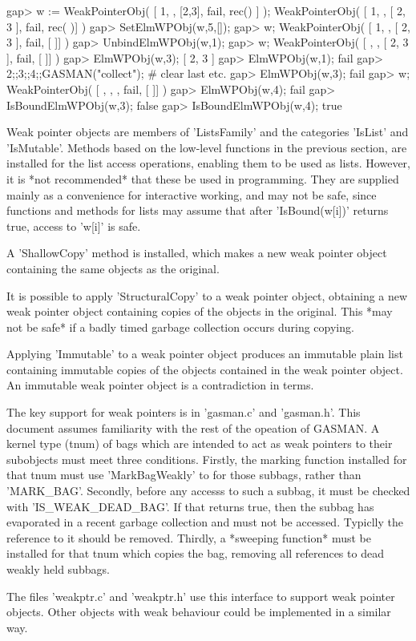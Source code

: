 \begintt
    gap>  w := WeakPointerObj( [ 1, , [2,3], fail, rec() ] );   
    WeakPointerObj( [ 1, , [ 2, 3 ], fail, rec(
       )] )
    gap> SetElmWPObj(w,5,[]);
    gap> w;
    WeakPointerObj( [ 1, , [ 2, 3 ], fail, [  ]] )
    gap> UnbindElmWPObj(w,1);
    gap> w;
    WeakPointerObj( [ , , [ 2, 3 ], fail, [  ]] )
    gap> ElmWPObj(w,3);      
    [ 2, 3 ]
    gap> ElmWPObj(w,1);
    fail
    gap> 2;;3;;4;;GASMAN("collect"); # clear last etc.
    gap> ElmWPObj(w,3);          
    fail
    gap> w;
    WeakPointerObj( [ , , , fail, [  ]] )
    gap> ElmWPObj(w,4);
    fail
    gap> IsBoundElmWPObj(w,3);
    false
    gap> IsBoundElmWPObj(w,4);
    true
\endtt    
    

Weak pointer objects are members of 'ListsFamily' and the categories 'IsList'
and 'IsMutable'.  Methods based  on  the low-level functions in  the previous
section, are  installed for the list  access operations,  enabling them to be
used as lists.    However, it is  *not recommended*  that  these be used   in
programming. They   are  supplied mainly as   a convenience  for  interactive
working, and   may not be   safe, since functions  and methods  for lists may
assume that after 'IsBound(w[i])' returns true, access to 'w[i]' is safe.


A 'ShallowCopy'  method is installed, which  makes a  new weak pointer object
containing the same objects as the original.

It is possible to apply 'StructuralCopy'  to a weak pointer object, obtaining
a new weak  pointer object containing copies of  the objects in the original. 
This *may  not  be safe*  if a  badly timed garbage  collection occurs during
copying.

Applying 'Immutable'  to a weak   pointer object produces an  immutable plain
list containing immutable copies of the objects contained in the weak pointer
object. An immutable weak pointer object is a contradiction in terms.
    

The  key support for weak  pointers  is in 'gasman.c'  and 'gasman.h'.   This
document  assumes  familiarity with  the rest of  the  opeation of GASMAN.  A
kernel type (tnum)  of  bags which are intended   to act as weak  pointers to
their subobjects  must meet three  conditions.  Firstly, the marking function
installed for that tnum must use 'MarkBagWeakly' to for those subbags, rather
than 'MARK_BAG'. Secondly,  before any accesss to such  a subbag,  it must be
checked with  'IS_WEAK_DEAD_BAG'. If that returns  true,  then the subbag has
evaporated in a recent garbage collection and must  not be accessed. Typiclly
the reference to it should be removed. Thirdly, a *sweeping function* must be
installed for that tnum which copies the bag, removing all references to dead
weakly held subbags.

The  files 'weakptr.c' and  'weakptr.h'  use this  interface  to support weak
pointer objects. Other objects with weak behaviour  could be implemented in a
similar way.

    